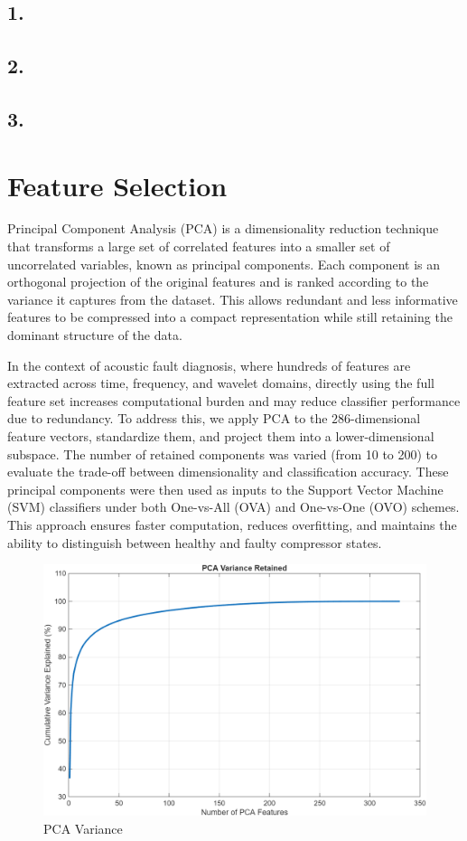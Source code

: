 \documentclass[12pt,a4paper]{article}
\begin{document}
\begin{multicols}{2}
\subsection{1.}
\subsection{2.}
\subsection{3.}
\section{Feature Selection}
\label{sec:features}
Principal Component Analysis (PCA) is a dimensionality reduction technique that
transforms a large set of correlated features into a smaller set of uncorrelated
variables, known as principal components. Each component is an orthogonal
projection of the original features and is ranked according to the variance it
captures from the dataset. This allows redundant and less informative features
to be compressed into a compact representation while still retaining the
dominant structure of the data.

In the context of acoustic fault diagnosis, where hundreds of features are
extracted across time, frequency, and wavelet domains, directly using the full
feature set increases computational burden and may reduce classifier performance
due to redundancy. To address this, we apply PCA to the $286$-dimensional feature
vectors, standardize them, and project them into a lower-dimensional subspace.
The number of retained components was varied (from 10 to 200) to evaluate the
trade-off between dimensionality and classification accuracy. These principal
components were then used as inputs to the Support Vector Machine (SVM)
classifiers under both One-vs-All (OVA) and One-vs-One (OVO) schemes. This
approach ensures faster computation, reduces overfitting, and maintains the
ability to distinguish between healthy and faulty compressor states.
\begin{figure}[H]
    \centering
    \includegraphics[width=1\linewidth]{Diagrams/pcavar.png}
    \caption{PCA Variance}
    \label{fig:PCA Variance}
\end{figure}

\end{multicols}
\end{document}
